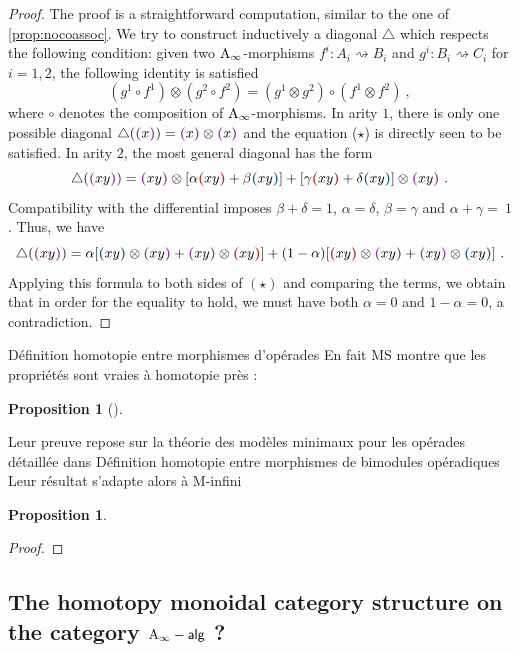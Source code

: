 \documentclass[twoside, 12pt]{amsart}
\newtheorem{proposition}[definition]{Proposition}
\theoremstyle{remark}
\begin{document}
\begin{proof} 
  The proof is a straightforward computation, similar to the one of \cref{prop:nocoassoc}. 
  We try to construct inductively a diagonal $\triangle$ which respects the following condition: given two $\mathrm{A}_\infty$-morphisms $f^i : A_i \rightsquigarrow B_i$ and $g^i : B_i \rightsquigarrow C_i$ for $i=1,2$, the following identity is satisfied \[ (g^1 \circ f^1) \otimes (g^2 \circ f^2) = (g^1 \otimes g^2) \circ (f^1 \otimes f^2) \ , \tag{$\star$}\]
  where $\circ$ denotes the composition of $\mathrm{A}_\infty$-morphisms. 
  In arity $1$, there is only one possible diagonal $\triangle(\purple{x})=\purple{x} \otimes \purple{x}$ and the equation ($\star$) is directly seen to be satisfied. 
  In arity $2$, the most general diagonal has the form \[ \triangle(\purple{xy})=\purple{xy} \otimes [\alpha \red{xy} + \beta \blue{xy}] + [\gamma \red{xy}+ \delta \blue{xy}]\otimes \purple{xy} \ . \]
  Compatibility with the differential imposes $\beta + \delta =1$, $\alpha=\delta$, $\beta=\gamma$ and $\alpha + \gamma =~1$.
  Thus, we have \[\triangle (\purple{xy})= \alpha [\blue{xy}\otimes \purple{xy} + \purple{xy}\otimes\red{xy}] + (1-\alpha)[\red{xy}\otimes \purple{xy}+\purple{xy}\otimes \blue{xy}] \ . \] 
  Applying this formula to both sides of $(\star)$ and comparing the terms, we obtain that in order for the equality to hold, we must have both $\alpha=0$ and $1-\alpha=0$, a contradiction. 
\end{proof}

Définition homotopie entre morphismes d'opérades
En fait MS montre que les propriétés sont vraies à homotopie près :

\begin{proposition}[{\cite{MSS}}]
\end{proposition}

Leur preuve repose sur la théorie des modèles minimaux pour les opérades détaillée dans
Définition homotopie entre morphismes de bimodules opéradiques
Leur résultat s'adapte alors à M-infini

\begin{proposition}
\end{proposition}

\begin{proof}
\end{proof}

\subsection{The homotopy monoidal category structure on the category $\mathsf{\mathrm{A}_\infty -alg}$ ?}
\end{document}
